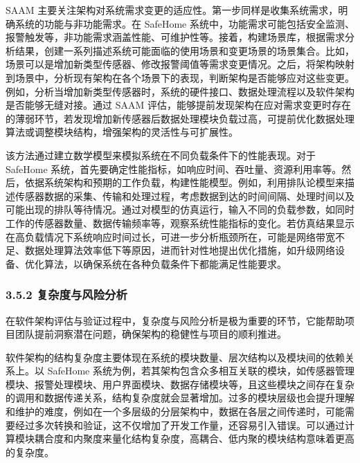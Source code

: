 SAAM 主要关注架构对系统需求变更的适应性。第一步同样是收集系统需求，明确系统的功能与非功能需求。在 SafeHome 系统中，功能需求可能包括安全监测、报警触发等，非功能需求涵盖性能、可维护性等。接着，构建场景库，根据需求分析结果，创建一系列描述系统可能面临的使用场景和变更场景的场景集合。比如，场景可以是增加新类型传感器、修改报警阈值等需求变更情况。之后，将架构映射到场景中，分析现有架构在各个场景下的表现，判断架构是否能够应对这些变更。例如，分析当增加新类型传感器时，系统的硬件接口、数据处理流程以及软件架构是否能够无缝对接。通过 SAAM 评估，能够提前发现架构在应对需求变更时存在的薄弱环节，若发现增加新传感器后数据处理模块负载过高，可提前优化数据处理算法或调整模块结构，增强架构的灵活性与可扩展性。


该方法通过建立数学模型来模拟系统在不同负载条件下的性能表现。对于 SafeHome 系统，首先要确定性能指标，如响应时间、吞吐量、资源利用率等。然后，依据系统架构和预期的工作负载，构建性能模型。例如，利用排队论模型来描述传感器数据的采集、传输和处理过程，考虑数据到达的时间间隔、处理时间以及可能出现的排队等待情况。通过对模型的仿真运行，输入不同的负载参数，如同时工作的传感器数量、数据传输频率等，观察系统性能指标的变化。若仿真结果显示在高负载情况下系统响应时间过长，可进一步分析瓶颈所在，可能是网络带宽不足、数据处理算法效率低下等原因，进而针对性地提出优化措施，如升级网络设备、优化算法，以确保系统在各种负载条件下都能满足性能要求。

\hypertarget{ux590dux6742ux5ea6ux4e0eux98ceux9669ux5206ux6790}{%
\subsubsection{3.5.2 复杂度与风险分析}\label{ux590dux6742ux5ea6ux4e0eux98ceux9669ux5206ux6790}}

在软件架构评估与验证过程中，复杂度与风险分析是极为重要的环节，它能帮助项目团队提前洞察潜在问题，确保架构的稳健性与项目的顺利推进。



软件架构的结构复杂度主要体现在系统的模块数量、层次结构以及模块间的依赖关系上。以 SafeHome 系统为例，若其架构包含众多相互关联的模块，如传感器管理模块、报警处理模块、用户界面模块、数据存储模块等，且这些模块之间存在复杂的调用和数据传递关系，结构复杂度就会显著增加。过多的模块层级也会提升理解和维护的难度，例如在一个多层级的分层架构中，数据在各层之间传递时，可能需要经过多次转换和验证，这不仅增加了开发工作量，还容易引入错误。可以通过计算模块耦合度和内聚度来量化结构复杂度，高耦合、低内聚的模块结构意味着更高的复杂度。

